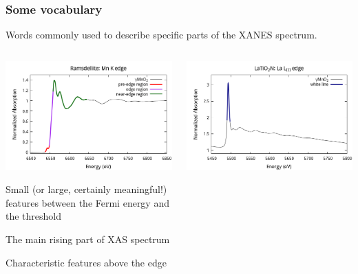 \documentclass[10pt, xcolor=x11names, compress]{beamer}
\begin{document}
\begin{frame}
  \frametitle{Some vocabulary}

  Words commonly used to describe specific parts of the XANES spectrum.

  \begin{columns}[T]
    \begin{column}{0.5\linewidth}
      \includegraphics[width=\linewidth]{images/rams/ramsdellite.png}

      \small

      \begin{description}[edge]
      \item[{\color{red}pre-edge}] Small (or large, certainly
        meaningful!) features between the Fermi energy and the
        threshold
      \item[{\color{DarkOrchid2}edge}] The main rising part of XAS spectrum
      \item[{\color{Green4}near-edge}] Characteristic features above the edge
      \end{description}
    \end{column}    
    \begin{column}{0.5\linewidth}
      \includegraphics[width=\linewidth]{images/ltno/ltno.png}


\end{column}
\end{columns}
\end{frame}
\end{document}
